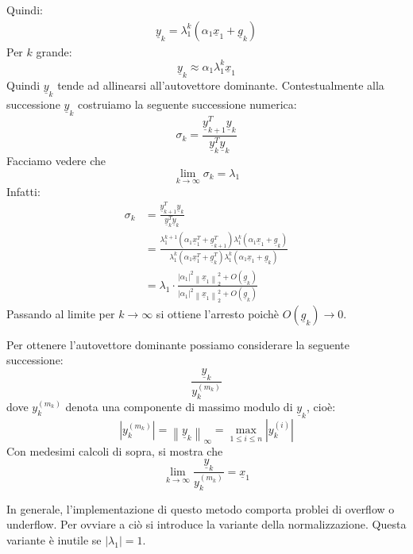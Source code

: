 \documentclass[12pt]{report}
\begin{document}
Quindi:
\begin{align}
\underline{y}_k = \lambda_1^k(\alpha_1\underline{x}_1 + \underline{g}_k)
\end{align}
Per $k$ grande:
\[
\underline{y}_k \approx \alpha_1\lambda_1^k\underline{x}_1
\]
Quindi $\underline{y}_k$ tende ad allinearsi all'autovettore dominante. Contestualmente alla successione $\underline{y}_k$ costruiamo la seguente successione numerica:
\[
\sigma_k = \frac{\underline{y}^T_{k+1}\underline{y}_k}{\underline{y}^T_k\underline{y}_k}
\]
Facciamo vedere che
\[
\lim\limits_{k \to \infty}\sigma_k = \lambda_1
\]
Infatti:
\begin{align*}
	\sigma_k &= \frac{\underline{y}_{k+1}^T\underline{y}_k}{\underline{y}_k^T\underline{y}_k} \\
	&= \frac{\lambda_1^{k+1}(\alpha_1\underline{x}_1^T + \underline{g}_{k+1}^T)\lambda_1^k(\alpha_1\underline{x}_1 + \underline{g}_k)}{\lambda_1^k(\alpha_1\underline{x}_1^T + \underline{g}_k^T)\lambda_1^k(\alpha_1\underline{x}_1 + \underline{g}_k)} \\
	&= \lambda_1\cdot\frac{\left|\alpha_1\right|^2\left\|\underline{x}_1\right\|^2_2 + O(\underline{g}_k)}{\left|\alpha_1\right|^2\left\|\underline{x}_1\right\|_2^2 + O(\underline{g}_k)}
\end{align*}
Passando al limite per $k \to \infty$ si ottiene l'arresto poichè $O(\underline{g}_k) \to 0$.

Per ottenere l'autovettore dominante possiamo considerare la seguente successione:
\[
\frac{\underline{y}_k}{y_k^{(m_k)}}
\]
dove $y_k^{(m_k)}$ denota una componente di massimo modulo di $\underline{y}_k$, cioè:
\[
\left| y_k^{(m_k)}\right| = \left\|\underline{y}_k\right\|_{\infty} = \max_{1 \leq i \leq n}\left| y_k^{(i)}\right|
\]
Con medesimi calcoli di sopra, si mostra che
\[
\lim\limits_{k\to\infty}\frac{\underline{y}_k}{y_k^{(m_k)}} = \underline{x}_1
\]

\begin{note}{}{}
In generale, l'implementazione di questo metodo comporta problei di overflow o underflow. Per ovviare a ciò si introduce la variante della normalizzazione. Questa variante è inutile se $\left|\lambda_1\right| = 1$.
\end{note}
\end{document}
